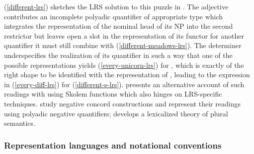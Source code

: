\documentclass[output=paper
	        ,collection
	        ,collectionchapter
 	        ,biblatex
                ,babelshorthands
                ,newtxmath
                ,draftmode
                ,colorlinks, citecolor=brown
]{langscibook}
\begin{document}
(\ref{different-lrs}) sketches the LRS solution to this puzzle in
\citet{Richter2016}. The
adjective  contributes an incomplete polyadic
quantifier of appropriate type which integrates the representation of
the nominal head of its NP into the second restrictor but leaves open
a slot in the representation of its functor for another quantifier it
must still combine with (\ref{different-meadows-lrs}). The determiner
 underspecifies the realization of its quantifier in such
a way that one of the possible representations yields
(\ref{every-unicorn-lrs}) for , which is exactly
of the right shape to be identified with the representation of
, leading to the expression in
(\ref{every-diff-lrs}) for (\ref{different-s-lrs}).
\citet{Lahm2016b} presents an alternative account of such readings
with  using Skolem functions which also hinges on
LRS-specific techniques. \citet{IordachioaiaandRichter2015} study 
negative concord constructions and represent their readings using polyadic negative
quantifiers; \citet{Lahm2018} develops a lexicalized theory
of plural semantics.




\subsubsection{Representation languages and notational conventions}
\end{document}
